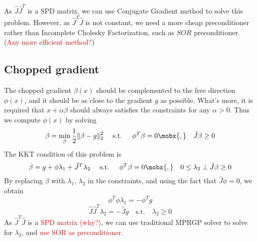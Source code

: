 \documentclass[9pt,twocolumn]{extarticle}
\newcommand{\TODO}[1]{\textcolor{red}{#1}}
\begin{document}
As $\hat{J}\hat{J}^T$ is a SPD matrix, we can use Conjugate Gradient method to solve this problem. However, as $\hat{J}^T\hat{J}$ is not constant, we need a more cheap preconditioner rather than Incomplete Cholesky Factorization, such as $SOR$ preconditioner. (\TODO{Any more efficient method?})

\subsection{Chopped gradient}
The chopped gradient $\beta(x)$ should be complemented to the free direction $\phi(x)$, and it should be as close to the gradient $g$ as possible. What's more, it is required that $x+\alpha \beta$ should always satisfies the constraints for any $\alpha > 0$. Thus we compute $\phi(x)$ by solving
\begin{equation}
  \beta = \min_\beta \frac{1}{2} \|\beta - g\|_2^2  \quad \mbox{ s.t. } \quad \phi^T \beta = 0 \mobx{, }\quad \hat{J} \beta \ge 0
\end{equation}
The KKT condition of this problem is
\begin{equation}
  \beta = g + \phi \lambda_1 + \hat{J}^T\lambda_2  \quad \mbox{ s.t. } \quad \phi^T \beta = 0 \mobx{, }\quad 0 \le \lambda_2 \perp \hat{J} \beta \ge 0
\end{equation}
By replacing $\beta$ with $\lambda_1$, $\lambda_2$ in the constraints, and using the fact that $\hat{J}\phi = 0$, we obtain
\begin{equation}
  \phi^T\phi \lambda_1 = -\phi^Tg
\end{equation}
\begin{equation}
  \hat{J}\hat{J}^T\lambda_2 = -\hat{J}g \quad \mbox{s.t.} \quad \lambda_2 \ge 0
\end{equation}
As $\hat{J}^T\hat{J}$ is a \TODO{SPD matrix (why?)}, we can use traditional MPRGP solver to solve for $\lambda_2$, and \TODO{use SOR as preconditioner}.
\end{document}
